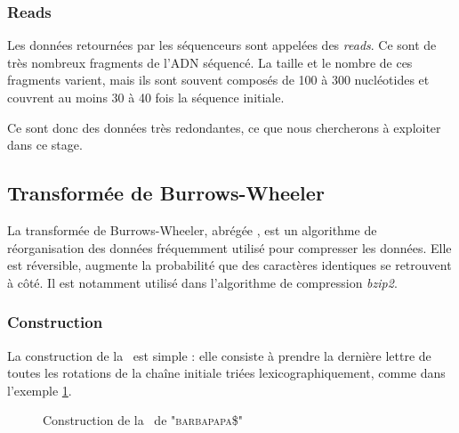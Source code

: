 \subsubsection{Reads}
Les données retournées par les séquenceurs sont appelées des \emph{reads}. Ce sont de très nombreux fragments de l'ADN séquencé. La taille et le nombre de ces fragments varient, mais ils sont souvent composés de 100 à 300 nucléotides et couvrent au moins 30 à 40 fois la séquence initiale. 

Ce sont donc des données très redondantes, ce que nous chercherons à exploiter dans ce stage.


\subsection{Transformée de Burrows-Wheeler}

La transformée de Burrows-Wheeler, abrégée \bwt, est un algorithme de réorganisation des données  fréquemment utilisé pour compresser les données. Elle est réversible, augmente la probabilité que des caractères identiques se retrouvent à côté. Il est notamment utilisé dans l'algorithme de compression \emph{bzip2}. 

\subsubsection{Construction}
La construction de la \bwt\ est simple : elle consiste à prendre la dernière lettre de toutes les rotations de la chaîne initiale triées lexicographiquement, comme dans l'exemple \ref{bwt}.

\begin{figure}[h!]
\caption{Construction de la \bwt\ de "\textsc{barbapapa\$}"}
\label{bwt}
\end{figure}

